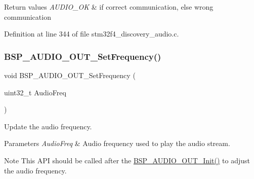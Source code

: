 \begin{DoxyRetVals}{Return values}
{\em A\+U\+D\+I\+O\+\_\+\+OK} & if correct communication, else wrong communication \\
\hline
\end{DoxyRetVals}


Definition at line 344 of file stm32f4\+\_\+discovery\+\_\+audio.\+c.

\mbox{\label{group___s_t_m32_f4___d_i_s_c_o_v_e_r_y___a_u_d_i_o___o_u_t___exported___functions_gaf9159656c0f4dde08c62334a25d4b106}} 
\subsubsection{\texorpdfstring{B\+S\+P\+\_\+\+A\+U\+D\+I\+O\+\_\+\+O\+U\+T\+\_\+\+Set\+Frequency()}{BSP\_AUDIO\_OUT\_SetFrequency()}}
{\footnotesize\ttfamily void B\+S\+P\+\_\+\+A\+U\+D\+I\+O\+\_\+\+O\+U\+T\+\_\+\+Set\+Frequency (\begin{DoxyParamCaption}\item[{uint32\+\_\+t}]{Audio\+Freq }\end{DoxyParamCaption})}



Update the audio frequency. 


\begin{DoxyParams}{Parameters}
{\em Audio\+Freq} & Audio frequency used to play the audio stream. \\
\hline
\end{DoxyParams}
\begin{DoxyNote}{Note}
This A\+PI should be called after the \mbox{\hyperlink{group___s_t_m32_f4___d_i_s_c_o_v_e_r_y___a_u_d_i_o___o_u_t___private___functions_gae713c698a93ff492424c6a8363f53bcc}{B\+S\+P\+\_\+\+A\+U\+D\+I\+O\+\_\+\+O\+U\+T\+\_\+\+Init()}} to adjust the audio frequency. 
\end{DoxyNote}


